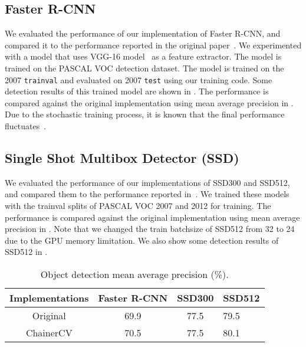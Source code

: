 \documentclass[sigconf]{acmart}
\begin{document}
\subsection{Faster R-CNN}
We evaluated the performance of our implementation of Faster R-CNN, and compared it to the performance reported in the original paper~\cite{Ren2015}.
We experimented with a model that uses VGG-16 model~\cite{Simonyan14c} as a feature extractor.
The model is trained on the PASCAL VOC detection dataset.
The model is trained on the 2007 \texttt{trainval} and evaluated on 2007 \texttt{test} using our training code.
Some detection results of this trained model are shown in .
The performance is compared against the original implementation using mean average precision in . 
Due to the stochastic training process, it is known that the final performance fluctuates~\cite{chen17implementation}.




\subsection{Single Shot Multibox Detector (SSD)}
We evaluated the performance of our implementations of SSD300 and SSD512, and compared them to the performance reported in~\cite{Fu2017}.
We trained these models with the trainval splits of PASCAL VOC 2007 and 2012 for training.
The performance is compared against the original implementation using mean average precision in . Note that we changed the train batchsize of SSD512 from 32 to 24 due to the GPU
memory limitation.
We also show some detection results of SSD512 in .
\begin{table}[t]
  \caption{Object detection mean average precision (\%).}
  \label{table:detection}
  \begin{tabular}{cccl}
	\toprule
    Implementations & Faster R-CNN & SSD300 & SSD512 \\
    \midrule
    Original & 69.9 \cite{Ren2015} & 77.5 \cite{Fu2017} & 79.5 \cite{Fu2017} \\
    ChainerCV & 70.5 & 77.5 & 80.1 \\
    \bottomrule
  \end{tabular}
\end{table}
\end{document}
